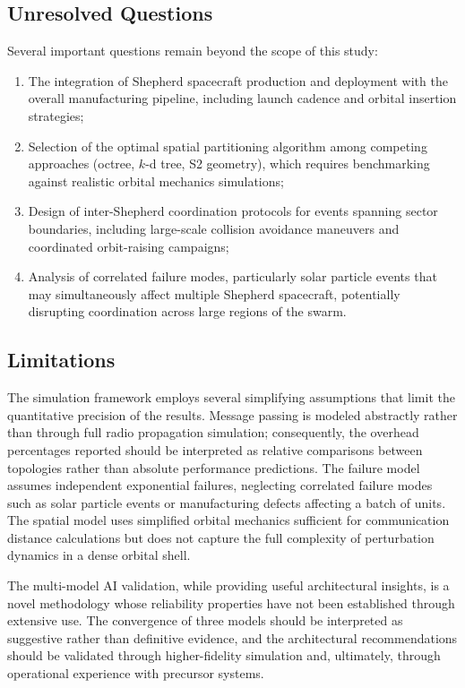 \documentclass[journal]{IEEEtran}
\begin{document}
\subsection{Unresolved Questions}

Several important questions remain beyond the scope of this study:

\begin{enumerate}
    \item The integration of Shepherd spacecraft production and deployment with the overall manufacturing pipeline, including launch cadence and orbital insertion strategies;
    \item Selection of the optimal spatial partitioning algorithm among competing approaches (octree, $k$-d tree, S2 geometry), which requires benchmarking against realistic orbital mechanics simulations;
    \item Design of inter-Shepherd coordination protocols for events spanning sector boundaries, including large-scale collision avoidance maneuvers and coordinated orbit-raising campaigns;
    \item Analysis of correlated failure modes, particularly solar particle events that may simultaneously affect multiple Shepherd spacecraft, potentially disrupting coordination across large regions of the swarm.
\end{enumerate}

\subsection{Limitations}

The simulation framework employs several simplifying assumptions that limit the quantitative precision of the results. Message passing is modeled abstractly rather than through full radio propagation simulation; consequently, the overhead percentages reported should be interpreted as relative comparisons between topologies rather than absolute performance predictions. The failure model assumes independent exponential failures, neglecting correlated failure modes such as solar particle events or manufacturing defects affecting a batch of units. The spatial model uses simplified orbital mechanics sufficient for communication distance calculations but does not capture the full complexity of perturbation dynamics in a dense orbital shell.

The multi-model AI validation, while providing useful architectural insights, is a novel methodology whose reliability properties have not been established through extensive use. The convergence of three models should be interpreted as suggestive rather than definitive evidence, and the architectural recommendations should be validated through higher-fidelity simulation and, ultimately, through operational experience with precursor systems.
\end{document}
